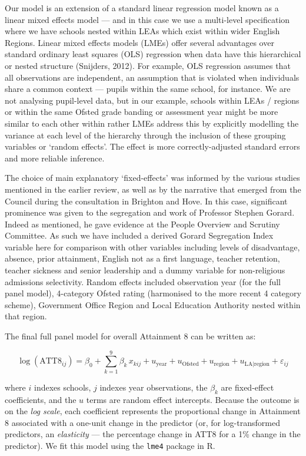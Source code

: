 \documentclass[
  11pt,
]{article}
\begin{document}
\endgroup{}

Our model is an extension of a standard linear regression model known as
a linear mixed effects model --- and in this case we use a multi-level
specification where we have schools nested within LEAs which exist
within wider English Regions. Linear mixed effects models (LMEs) offer
several advantages over standard ordinary least squares (OLS) regression
when data have this hierarchical or nested structure (Snijders, 2012).
For example, OLS regression assumes that all observations are
independent, an assumption that is violated when individuals share a
common context --- pupils within the same school, for instance. We are
not analysing pupil-level data, but in our example, schools within LEAs
/ regions or within the same Ofsted grade banding or assessment year
might be more similar to each other within rather LMEs address this by
explicitly modelling the variance at each level of the hierarchy through
the inclusion of these grouping variables or `random effects'. The
effect is more correctly-adjusted standard errors and more reliable
inference.

The choice of main explanatory `fixed-effects' was informed by the
various studies mentioned in the earlier review, as well as by the
narrative that emerged from the Council during the consultation in
Brighton and Hove. In this case, significant prominence was given to the
segregation and work of Professor Stephen Gorard. Indeed as mentioned,
he gave evidence at the People Overview and Scrutiny Committee. As such
we have included a derived Gorard Segregation Index variable here for
comparison with other variables including levels of disadvantage,
absence, prior attainment, English not as a first language, teacher
retention, teacher sickness and senior leadership and a dummy variable
for non-religious admissions selectivity. Random effects included
observation year (for the full panel model), 4-category Ofsted rating
(harmonised to the more recent 4 category scheme), Government Office
Region and Local Education Authority nested within that region.

The final full panel model for overall Attainment 8 can be written as:

\[
\log(\text{ATT8}_{ij}) = \beta_0 + \sum_{k=1}^{9} \beta_k \, x_{kij} + u_{\text{year}} + u_{\text{Ofsted}} + u_{\text{region}} + u_{\text{LA|region}} + \varepsilon_{ij}
\]

where \(i\) indexes schools, \(j\) indexes year observations, the
\(\beta_k\) are fixed-effect coefficients, and the \(u\) terms are
random effect intercepts. Because the outcome is on the \emph{log
scale}, each coefficient represents the proportional change in
Attainment 8 associated with a one-unit change in the predictor (or, for
log-transformed predictors, an \emph{elasticity} --- the percentage
change in ATT8 for a 1\% change in the predictor). We fit this model
using the \texttt{lme4} package in R.
\end{document}
